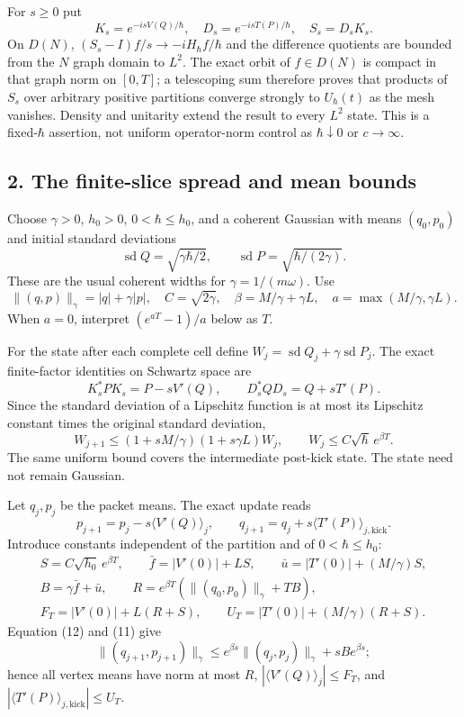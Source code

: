 \documentclass[11pt,a4paper]{article}
\begin{document}
For \(s\ge0\) put \[K_s=e^{-isV(Q)/\hbar},\quad D_s=e^{-isT(P)/\hbar},
 \quad S_s=D_sK_s.\tag{7}\] On \(D(N)\),
\((S_s-I)f/s\to-iH_\hbar f/\hbar\) and the difference quotients are
bounded from the \(N\) graph domain to \(L^2\). The exact orbit of
\(f\in D(N)\) is compact in that graph norm on \([0,T]\); a telescoping
sum therefore proves that products of \(S_s\) over arbitrary positive
partitions converge strongly to \(U_\hbar(t)\) as the mesh vanishes.
Density and unitarity extend the result to every \(L^2\) state. This is
a fixed-\(\hbar\) assertion, not uniform operator-norm control as
\(\hbar\downarrow0\) or \(c\to\infty\).

\hypertarget{the-finite-slice-spread-and-mean-bounds}{%
\subsection{2. The finite-slice spread and mean
bounds}\label{the-finite-slice-spread-and-mean-bounds}}

Choose \(\gamma>0\), \(h_0>0\), \(0<\hbar\le h_0\), and a coherent
Gaussian with means \((q_0,p_0)\) and initial standard deviations
\[\operatorname{sd}Q=\sqrt{\gamma\hbar/2},\qquad
 \operatorname{sd}P=\sqrt{\hbar/(2\gamma)}.\tag{8}\] These are the usual
coherent widths for \(\gamma=1/(m\omega)\). Use \[
 \|(q,p)\|_\gamma=|q|+\gamma|p|,\quad
 C=\sqrt{2\gamma},\quad
 \beta=M/\gamma+\gamma L,\quad
 a=\max(M/\gamma,\gamma L).\tag{9}
\] When \(a=0\), interpret \((e^{aT}-1)/a\) below as \(T\).

For the state after each complete cell define
\(W_j=\operatorname{sd}Q_j+\gamma\operatorname{sd}P_j\). The exact
finite-factor identities on Schwartz space are
\[K_s^*PK_s=P-sV'(Q),\qquad
 D_s^*QD_s=Q+sT'(P).\tag{10}\] Since the standard deviation of a
Lipschitz function is at most its Lipschitz constant times the original
standard deviation, \[
 W_{j+1}\le(1+sM/\gamma)(1+s\gamma L)W_j,\qquad
 W_j\le C\sqrt\hbar\,e^{\beta T}.\tag{11}
\] The same uniform bound covers the intermediate post-kick state. The
state need not remain Gaussian.

Let \(q_j,p_j\) be the packet means. The exact update reads \[
 p_{j+1}=p_j-s\langle V'(Q)\rangle_j,\qquad
 q_{j+1}=q_j+s\langle T'(P)\rangle_{j,\mathrm{kick}}.\tag{12}
\] Introduce constants independent of the partition and of
\(0<\hbar\le h_0\): \[
 \begin{gathered}
 S=C\sqrt{h_0}\,e^{\beta T},\qquad
 \bar f=|V'(0)|+LS,\qquad
 \bar u=|T'(0)|+(M/\gamma)S,\\
 B=\gamma\bar f+\bar u,\qquad
 R=e^{\beta T}(\|(q_0,p_0)\|_\gamma+TB),\\
 F_T=|V'(0)|+L(R+S),\qquad
 U_T=|T'(0)|+(M/\gamma)(R+S).
 \end{gathered}\tag{13}
\] Equation (12) and (11) give \[
 \|(q_{j+1},p_{j+1})\|_\gamma
 \le e^{\beta s}\|(q_j,p_j)\|_\gamma+sBe^{\beta s};
 \tag{14}
\] hence all vertex means have norm at most \(R\),
\(|\langle V'(Q)\rangle_j|\le F_T\), and
\(|\langle T'(P)\rangle_{j,\mathrm{kick}}|\le U_T\).
\end{document}
